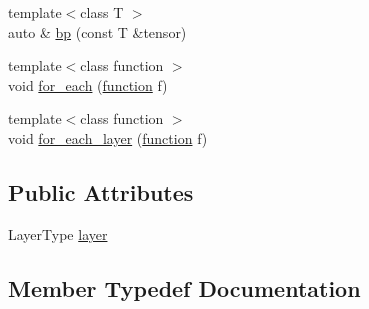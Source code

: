 \begin{DoxyCompactItemize}
{\footnotesize template$<$class T $>$ }\\auto \& \hyperlink{structBC_1_1nn_1_1Network_3_01Index_00_01DerivedNetwork_00_01LayerType_00_01lst_8_8_8_01_4_a63f86c93e6f65b3c1df7fed9bad94f8d}{bp} (const T \&tensor)
\item 
{\footnotesize template$<$class function $>$ }\\void \hyperlink{structBC_1_1nn_1_1Network_3_01Index_00_01DerivedNetwork_00_01LayerType_00_01lst_8_8_8_01_4_abaa9963bbc7ab8d3d285944ef6f8d7b1}{for\+\_\+each} (\hyperlink{namespaceBC_1_1nn_a5429ceaa392776ade7234175af39050d}{function} f)
\item 
{\footnotesize template$<$class function $>$ }\\void \hyperlink{structBC_1_1nn_1_1Network_3_01Index_00_01DerivedNetwork_00_01LayerType_00_01lst_8_8_8_01_4_a9f25a1e2cf745981a25288253310406e}{for\+\_\+each\+\_\+layer} (\hyperlink{namespaceBC_1_1nn_a5429ceaa392776ade7234175af39050d}{function} f)
\end{DoxyCompactItemize}
\subsection*{Public Attributes}
\begin{DoxyCompactItemize}
\item 
Layer\+Type \hyperlink{structBC_1_1nn_1_1Network_3_01Index_00_01DerivedNetwork_00_01LayerType_00_01lst_8_8_8_01_4_a38bae36469170424057fbd094b6483b1}{layer}
\end{DoxyCompactItemize}


\subsection{Member Typedef Documentation}
